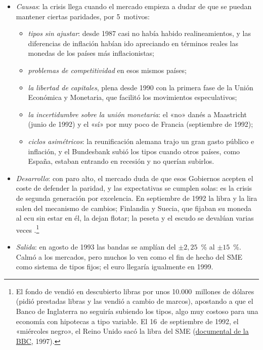 \documentclass[11pt]{article}
\begin{document}
\begin{itemize}
\item \emph{Causas}: la crisis llega cuando el mercado empieza a dudar de que se puedan mantener ciertas paridades, por 5~motivos:
  \begin{itemize}
  \item \emph{tipos sin ajustar}: desde 1987 casi no había habido realineamientos, y las diferencias de inflación habían ido apreciando en términos reales las monedas de los países más inflacionistas;
  \item \emph{problemas de competitividad} en esos mismos países;
  \item \emph{la libertad de capitales}, plena desde 1990 con la primera fase de la Unión Económica y Monetaria, que facilitó los movimientos especulativos;
  \item \emph{la incertidumbre sobre la unión monetaria}: el «no» danés a Maastricht (junio de 1992) y el «sí» por muy poco de Francia (septiembre de 1992);
  \item \emph{ciclos asimétricos}: la reunificación alemana trajo un gran gasto público e inflación, y el Bundesbank subió los tipos cuando otros países, como España, estaban entrando en recesión y no querían subirlos.
  \end{itemize}
\item \emph{Desarrollo}: con paro alto, el mercado duda de que esos Gobiernos acepten el coste de defender la paridad, y las expectativas se cumplen solas: es la crisis de segunda generación por excelencia. En septiembre de 1992 la libra y la lira salen del mecanismo de cambios; Finlandia y Suecia, que fijaban su moneda al ecu sin estar en él, la dejan flotar; la peseta y el escudo se devalúan varias veces\nocite{EichengreenWyplosz1993Unstable}  .\footnote{El fondo de  vendió en descubierto libras por unos 10.000~millones de dólares (pidió prestadas libras y las vendió a cambio de marcos), apostando a que el Banco de Inglaterra no seguiría subiendo los tipos, algo muy costoso para una economía con hipotecas a tipo variable. El 16~de septiembre de 1992, el «miércoles negro», el Reino Unido sacó la libra del SME (\href{https://youtu.be/K_oET45GzMI}{documental de la BBC}, 1997).}
\item \emph{Salida}: en agosto de 1993 las bandas se amplían del $\pm2,25$~\% al $\pm15$~\%. Calmó a los mercados, pero muchos lo ven como el fin de hecho del SME como sistema de tipos fijos; el euro llegaría igualmente en 1999.
\end{itemize}
\end{document}
